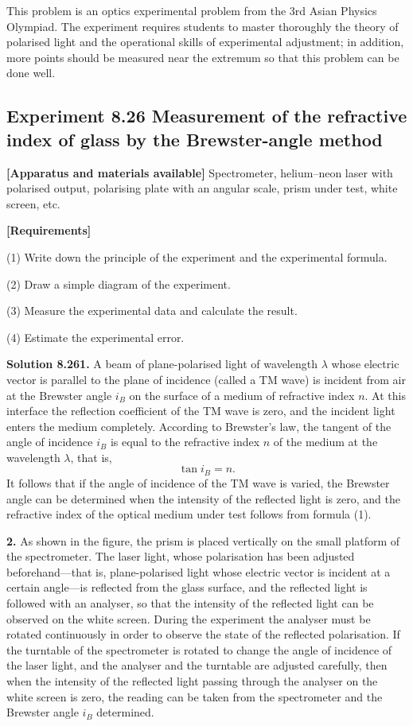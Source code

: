 \begin{commentary}
This problem is an optics experimental problem from the 3rd Asian Physics Olympiad. The experiment requires students to master thoroughly the theory of polarised light and the operational skills of experimental adjustment; in addition, more points should be measured near the extremum so that this problem can be done well.
\end{commentary}

\subsection*{Experiment 8.26 \quad Measurement of the refractive index of glass by the Brewster-angle method}

\textbf{[Apparatus and materials available]} Spectrometer, helium--neon laser with polarised output, polarising plate with an angular scale, prism under test, white screen, etc.

\textbf{[Requirements]}

(1) Write down the principle of the experiment and the experimental formula.

(2) Draw a simple diagram of the experiment.

(3) Measure the experimental data and calculate the result.

(4) Estimate the experimental error.

\textbf{Solution 8.26}\quad \textbf{1.} A beam of plane-polarised light of wavelength $\lambda$ whose electric vector is parallel to the plane of incidence (called a TM wave) is incident from air at the Brewster angle $i_B$ on the surface of a medium of refractive index $n$. At this interface the reflection coefficient of the TM wave is zero, and the incident light enters the medium completely. According to Brewster's law, the tangent of the angle of incidence $i_B$ is equal to the refractive index $n$ of the medium at the wavelength $\lambda$, that is,
\begin{equation}
\tan i_B=n. \tag{1}
\end{equation}
It follows that if the angle of incidence of the TM wave is varied, the Brewster angle can be determined when the intensity of the reflected light is zero, and the refractive index of the optical medium under test follows from formula (1).

\textbf{2.} As shown in the figure, the prism is placed vertically on the small platform of the spectrometer. The laser light, whose polarisation has been adjusted beforehand---that is, plane-polarised light whose electric vector is incident at a certain angle---is reflected from the glass surface, and the reflected light is followed with an analyser, so that the intensity of the reflected light can be observed on the white screen. During the experiment the analyser must be rotated continuously in order to observe the state of the reflected polarisation. If the turntable of the spectrometer is rotated to change the angle of incidence of the laser light, and the analyser and the turntable are adjusted carefully, then when the intensity of the reflected light passing through the analyser on the white screen is zero, the reading can be taken from the spectrometer and the Brewster angle $i_B$ determined.

